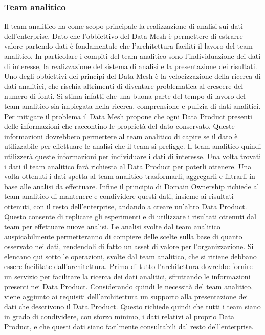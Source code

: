 \documentclass[12pt]{report}
\begin{document}
\subsubsection{Team analitico}
Il team analitico ha come scopo principale la realizzazione di analisi sui dati dell'enterprise.
Dato che l'obbiettivo del Data Mesh è permettere di estrarre valore partendo dati è fondamentale che l'architettura faciliti il lavoro del team analitico.
In particolare i compiti del team analitico sono l'individuazione dei dati di interesse, la realizzazione del sistema di analisi e la presentazione dei risultati. 
Uno degli obbiettivi dei principi del Data Mesh è la velocizzazione della ricerca di dati analitici, che rischia altrimenti di  diventare problematica al crescere del numero di fonti. 
Si stima infatti che una buona parte del tempo di lavoro del team analitico sia impiegata nella ricerca, comprensione e pulizia di dati analitici.
Per mitigare il problema il Data Mesh propone che ogni Data Product presenti delle informazioni che raccontino le proprietà del dato conservato.
Queste informazioni dovrebbero permettere al team analitico di capire se il dato è utilizzabile per effettuare le analisi che il team si prefigge. 
Il team analitico quindi utilizzerà queste informazioni per individuare i dati di interesse. 
Una volta trovati i dati il team analitico farà richiesta al Data Product per poterli ottenere.
Una volta ottenuti i dati spetta al team analitico trasformarli, aggregarli e filtrarli in base alle analisi da effettuare.
Infine il principio di Domain Ownership richiede al team analitico di mantenere e condividere questi dati, insieme ai risultati ottenuti, con il resto dell'enterprise, andando a creare un'altro Data Product.
Questo consente di replicare gli esperimenti e di utilizzare i risultati ottenuti dal team per effettuare nuove analisi.
Le analisi svolte dal team analitico auspicabilmente permetteranno di compiere delle scelte sulla base di quanto osservato nei dati, rendendoli di fatto un asset di valore per l'organizzazione.
Si elencano qui sotto le operazioni, svolte dal team analitico, che si ritiene debbano essere facilitate dall'architettura.
Prima di tutto l'architettura dovrebbe fornire un servizio per facilitare la ricerca dei dati analitici, sfruttando le informazioni presenti nei Data Product.
Considerando quindi le necessità del team analitico, viene aggiunto ai requisiti dell'architettura un supporto alla presentazione dei dati che descrivono il Data Product. 
Questo richiede quindi che tutti i team siano in grado di condividere, con sforzo minimo, i dati relativi al proprio Data Product, e che questi dati siano facilmente consultabili dal resto dell'enterprise.
\end{document}
